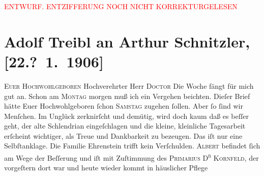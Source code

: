 
\begin{center}
            \textcolor{red}{ENTWURF. ENTZIFFERUNG NOCH NICHT KORREKTURGELESEN}
                      \end{center}
            
               \section[Adolf Treibl an Arthur Schnitzler, {[}22.? 1. 1906{]}]{ Adolf Treibl an Arthur Schnitzler, {[}22.? 1. 1906{]}}\nopagebreak{}\rehead{ }\begin{ledgroupsized}[t]{13cm}\normalsize\beginnumbering{} \toendnotes[C]{\smallbreak\pagebreak[2]} 
\toendnotes[C]{\smallbreak}\pstart
           \noindent{}{\pb}\textsc{Euer Hochwohlgeboren}\pend
           \pstart{}Hochverehrter Herr \textsc{Doctor}\pend\pstart
           Die Woche fängt für mich gut an. Schon am \textsc{Montag}{ }morgen muß ich ein Vergehen beichten. Dieſer Brief hätte Euer
                    Hochwohlgeboren ſchon \textsc{Samstag} zugehen ſollen. Aber ſo ſind wir Menſchen. Im Unglück zerknirſcht und
                    demütig, wird doch {\pb}kaum daß es beſſer geht, der
                    alte Schlendrian eingeſchlagen und die kleine, kleinliche Tagesarbeit erſcheint
                    wichtiger, als Treue und Dankbarkeit zu bezeugen. Das iſt nur eine
                    Selbſtanklage. Die Familie Ehrenstein
                    trifft kein Verſchulden.\pend
           \pstart
           \textsc{Albert} befindet ſich am Wege der Beſſerung und iſt mit Zuſtimmung des \textsc{Prima{\pb}rius D\textsuperscript{r}}{ }\textsc{Kornfeld}, der vorgeſtern dort war und heute wieder kommt in häuslicher Pflege

\end{ledgroupsized}
